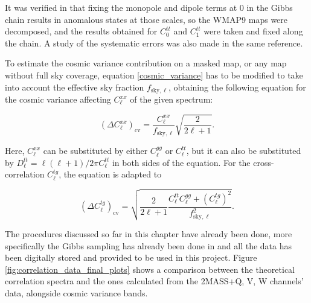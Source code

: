 \documentclass[openany,a4paper,12pt,oneside]{book}
\begin{document}
\begin{spacing}{1.5}
It was verified in \cite{Moura-Santos_2016} that fixing the monopole and dipole terms at 0 in the Gibbs chain results in anomalous states at those scales, so the WMAP9 maps were decomposed, and the results obtained for $C_0^{tt}$ and $C_1^{tt}$ were taken and fixed along the chain. A study of the systematic errors was also made in the same reference. 

To estimate the cosmic variance contribution on a masked map, or any map without full sky coverage, equation \eqref{cosmic_variance} has to be modified to take into account the effective sky fraction $f_{\text{sky},\ell}$, obtaining the following equation for the cosmic variance affecting $C_\ell^{xx}$ of the given spectrum\cite{wmap_supplement}: 

\begin{equation}\label{data_cosmic_variance}
	(\Delta C_\ell^{xx})_\text{cv}=\frac{C_\ell^{xx}}{f_{\text{sky},\ell}}\sqrt{\frac{2}{2\ell+1}}.
\end{equation}

Here, $C_\ell^{xx}$ can be substituted by either $C_\ell^{gg}$ or $C_\ell^{tt}$, but it can also be substituted by $D_\ell^{tt}=\ell(\ell+1)/2\pi C_\ell^{tt}$ in both sides of the equation. For the cross-correlation $C_\ell^{tg}$, the equation is adapted to

\begin{equation}\label{cosmic_variance_cross}
	(\Delta C_\ell^{tg})_\text{cv}=\sqrt{\frac{2}{2\ell+1}\frac{C_\ell^{tt}C_\ell^{gg}+(C_\ell^{tg})^2}{f_{\text{sky},\ell}^2}}.
\end{equation}

The procedures discussed so far in this chapter have already been done, more specifically the Gibbs sampling has already been done in \cite{Moura-Santos_2016} and all the data has been digitally stored and provided to be used in this project. Figure \ref{fig:correlation_data_final_plots} shows a comparison between the theoretical correlation spectra and the ones calculated from the 2MASS+Q, V, W channels' data, alongside cosmic variance bands.


\end{spacing}
\end{document}
